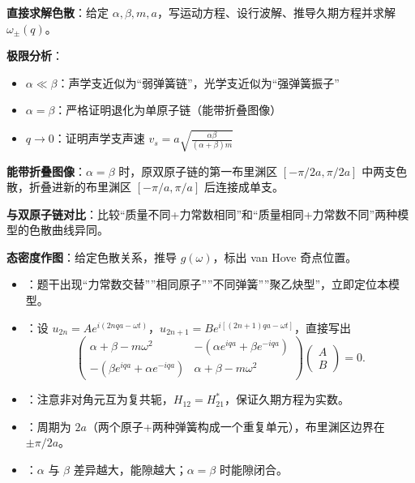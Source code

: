 \begin{drillbox}[训练点与考法变体]
 \textbf{直接求解色散}：给定 $\alpha, \beta, m, a$，写运动方程、设行波解、推导久期方程并求解 $\omega_{\pm}(q)$。

 \textbf{极限分析}：
\begin{itemize}[nosep]
    \item $\alpha\ll\beta$：声学支近似为``弱弹簧链''，光学支近似为``强弹簧振子''
    \item $\alpha=\beta$：严格证明退化为单原子链（能带折叠图像）
    \item $q\to0$：证明声学支声速 $v_s=a\sqrt{\frac{\alpha\beta}{(\alpha+\beta)m}}$
\end{itemize}

 \textbf{能带折叠图像}：$\alpha=\beta$ 时，原双原子链的第一布里渊区 $[-\pi/2a,\pi/2a]$ 中两支色散，折叠进新的布里渊区 $[-\pi/a,\pi/a]$ 后连接成单支。

 \textbf{与双原子链对比}：比较``质量不同+力常数相同''和``质量相同+力常数不同''两种模型的色散曲线异同。

 \textbf{态密度作图}：给定色散关系，推导 $g(\omega)$，标出 van Hove 奇点位置。
\end{drillbox}

\begin{tipbox}[快速识别与解题技巧]
\begin{itemize}
    \item {}：题干出现``力常数交替''''相同原子''''不同弹簧''''聚乙炔型''，立即定位本模型。
    \item {}：设 $u_{2n}=Ae^{i(2nqa-\omega t)}$，$u_{2n+1}=Be^{i[(2n+1)qa-\omega t]}$，直接写出
    \[
    \begin{pmatrix}\alpha+\beta-m\omega^2 & -(\alpha e^{iqa}+\beta e^{-iqa})\\ -(\beta e^{iqa}+\alpha e^{-iqa}) & \alpha+\beta-m\omega^2\end{pmatrix}\begin{pmatrix}A\\ B\end{pmatrix}=0.
    \]
    \item {}：注意非对角元互为复共轭，$H_{12}=H_{21}^*$，保证久期方程为实数。
    \item {}：周期为 $2a$（两个原子+两种弹簧构成一个重复单元），布里渊区边界在 $\pm\pi/2a$。
    \item {}：$\alpha$ 与 $\beta$ 差异越大，能隙越大；$\alpha=\beta$ 时能隙闭合。
\end{itemize}
\end{tipbox}

